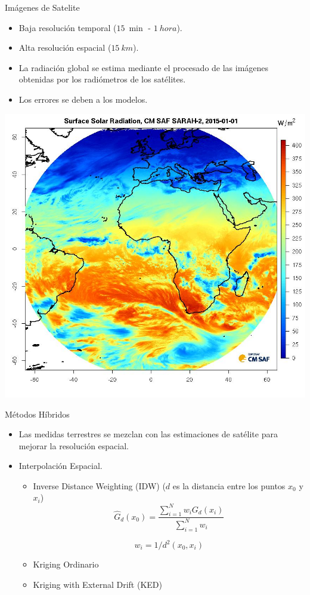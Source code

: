 \documentclass[xcolor={usenames,svgnames,dvipsnames}]{beamer}
\begin{document}
\begin{frame}[label={sec:org11ec33e}]{Imágenes de Satelite}
\begin{itemize}
\item Baja resolución temporal (\(\SI{15}{\min}\) - \(\SI{1}{hora}\)).

\item Alta resolución espacial (\(\SI{15}{km}\)).

\item La radiación global se estima mediante el procesado de las imágenes obtenidas por los radiómetros de los satélites.

\item Los errores se deben a los modelos.
\end{itemize}

\begin{center}
\includegraphics[height=0.5\textheight]{../figs/CMSAF.png}
\end{center}
\end{frame}

\begin{frame}[label={sec:org650bd36}]{Métodos Híbridos}
\begin{itemize}
\item Las medidas terrestres se mezclan con las estimaciones de satélite para mejorar la resolución espacial.
\item Interpolación Espacial.
\begin{itemize}
\item \alert{Inverse Distance Weighting (IDW)} (\(d\) es la distancia entre los puntos \(x_0\) y  \(x_i\))
\[
\widehat{G}_d(x_0) = \frac{\sum_{i=1}^N w_i G_{d}(x_i)}{\sum_{i=1}^N w_i} 
\]

\[
  w_i = 1/d^2(x_0, x_i)
\]
\item \alert{Kriging Ordinario}
\item \alert{Kriging with External Drift (KED)}
\end{itemize}
\end{itemize}
\end{frame}
\end{document}
